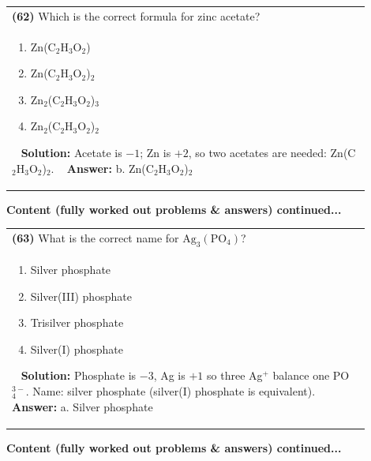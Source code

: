 \documentclass{article}
\begin{document}
\begin{tabular}{|p{0.9\linewidth}|}
\hline
\vspace{0.2cm}
\textbf{(62)} Which is the correct formula for zinc acetate? \\
\begin{minipage}[t]{0.85\linewidth}
\begin{enumerate}[label=\alph*.]
\item Zn(C$_2$H$_3$O$_2$) \
\item Zn(C$_2$H$_3$O$_2$)$_2$ \
\item Zn$_2$(C$_2$H$_3$O$_2$)$_3$ \
\item Zn$_2$(C$_2$H$_3$O$_2$)$_2$
\end{enumerate}
\end{minipage}\
\hline
\vspace{0.2cm}
\textbf{Solution:} Acetate is $-1$; Zn is $+2$, so two acetates are needed: Zn(C$_2$H$_3$O$_2$)$_2$. \
\hline
\vspace{0.2cm}
\textbf{Answer:} b. Zn(C$_2$H$_3$O$_2$)$_2$ \
\hline
\end{tabular}
\newpage
\noindent
{\large\textbf{Content (fully worked out problems & answers) continued...}}\\[0.2em]
\begin{tabular}{|p{0.9\linewidth}|}
\hline
\vspace{0.2cm}
\textbf{(63)} What is the correct name for $\text{Ag}_3(\text{PO}_4)$? \\
\begin{minipage}[t]{0.85\linewidth}
\begin{enumerate}[label=\alph*.]
\item Silver phosphate \
\item Silver(III) phosphate \
\item Trisilver phosphate \
\item Silver(I) phosphate
\end{enumerate}
\end{minipage}\
\hline
\vspace{0.2cm}
\textbf{Solution:} Phosphate is $-3$, Ag is $+1$ so three Ag$^+$ balance one PO$_4^{3-}$. Name: silver phosphate (silver(I) phosphate is equivalent). \
\hline
\vspace{0.2cm}
\textbf{Answer:} a. Silver phosphate \
\hline
\end{tabular}
\newpage
\noindent
{\large\textbf{Content (fully worked out problems & answers) continued...}}\\[0.2em]
\end{document}

